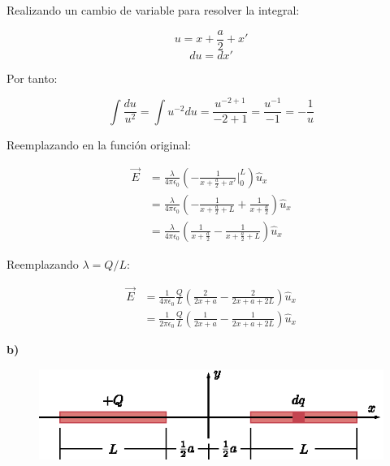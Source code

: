 \documentclass[letter,11pt]{article}
\begin{document}
Realizando un cambio de variable para resolver la integral:

\begin{equation*}
    u = x+\frac{a}{2}+x'
\end{equation*}
\begin{equation*}
    du = dx'
\end{equation*}
\vspace{0.20cm}

Por tanto:

\begin{equation*}
    \int\frac{du}{u^2} = \int u^{-2}du
                       = \frac{u^{-2+1}}{-2+1}
                       = \frac{u^{-1}}{-1}
                       = -\frac{1}{u}
\end{equation*}
\vspace{0.20cm}

Reemplazando en la función original:

\begin{equation*}
\begin{split}
    \vec{E} &= \frac{\lambda}{4\pi\epsilon_0}
               \left(-\frac{1}{x+\frac{a}{2}+x'}\Biggr|_0^L\right)
               \hat{u}_x\\
            &= \frac{\lambda}{4\pi\epsilon_0}
               \left(-\frac{1}{x+\frac{a}{2}+L}+
               \frac{1}{x+\frac{a}{2}}\right)\hat{u}_x\\
            &= \frac{\lambda}{4\pi\epsilon_0}
               \left(\frac{1}{x+\frac{a}{2}}-
               \frac{1}{x+\frac{a}{2}+L}\right)\hat{u}_x
\end{split}
\end{equation*}
\vspace{0.20cm}

Reemplazando $\lambda=Q/L$:

\begin{equation*}
\begin{split}
    \vec{E} &= \frac{1}{4\pi\epsilon_0}\frac{Q}{L}
               \left(\frac{2}{2x+a}-\frac{2}{2x+a+2L}\right)\hat{u}_x\\
            &= \frac{1}{2\pi\epsilon_0}\frac{Q}{L}
               \left(\frac{1}{2x+a}-\frac{1}{2x+a+2L}\right)\hat{u}_x
\end{split}
\end{equation*}
\vspace{0.20cm}

\textbf{b)}
\begin{figure}[!h]
\centering
\includegraphics[scale=1.50]{resources/f3.eps}
\end{figure}
\vspace{0.20cm}
\end{document}
